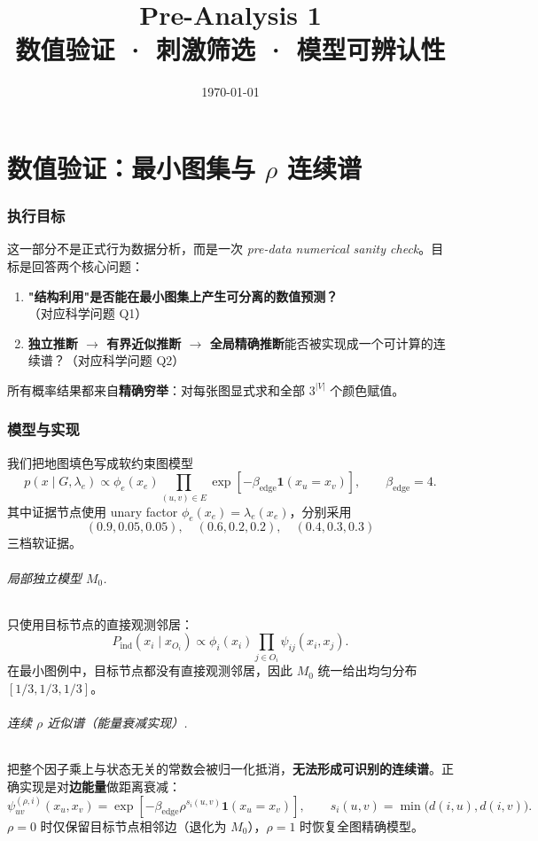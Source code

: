 \documentclass[11pt,a4paper]{ctexart}
\title{Pre-Analysis 1\\[4pt]
\large 数值验证 · 刺激筛选 · 模型可辨认性}
\author{}
\date{\today}
\begin{document}
\maketitle

\tableofcontents
\bigskip

\part{数值验证：最小图集与 $\rho$ 连续谱}

\section{执行目标}

这一部分不是正式行为数据分析，而是一次 \emph{pre-data numerical sanity check}。目标是回答两个核心问题：
\begin{enumerate}
    \item \textbf{"结构利用"是否能在最小图集上产生可分离的数值预测？}（对应科学问题 Q1）
    \item \textbf{独立推断 $\rightarrow$ 有界近似推断 $\rightarrow$ 全局精确推断}能否被实现成一个可计算的连续谱？（对应科学问题 Q2）
\end{enumerate}

所有概率结果都来自\textbf{精确穷举}：对每张图显式求和全部 $3^{|V|}$ 个颜色赋值。

\section{模型与实现}

我们把地图填色写成软约束图模型
\[
p(x\mid G,\lambda_e)\propto
\phi_e(x_e)\prod_{(u,v)\in E}\exp\!\left[-\beta_{\mathrm{edge}}\mathbf{1}(x_u=x_v)\right],
\qquad \beta_{\mathrm{edge}}=4.
\]
其中证据节点使用 unary factor $\phi_e(x_e)=\lambda_e(x_e)$，分别采用
\[
(0.9,0.05,0.05),\quad (0.6,0.2,0.2),\quad (0.4,0.3,0.3)
\]
三档软证据。

\paragraph{局部独立模型 $M_0$.}
只使用目标节点的直接观测邻居：
\[
P_{\mathrm{ind}}(x_i\mid x_{O_i})
\propto
\phi_i(x_i)\prod_{j\in O_i}\psi_{ij}(x_i,x_j).
\]
在最小图例中，目标节点都没有直接观测邻居，因此 $M_0$ 统一给出均匀分布 $[1/3,1/3,1/3]$。

\paragraph{连续 $\rho$ 近似谱（能量衰减实现）.}
把整个因子乘上与状态无关的常数会被归一化抵消，\textbf{无法形成可识别的连续谱}。正确实现是对\textbf{边能量}做距离衰减：
\[
\psi^{(\rho,i)}_{uv}(x_u,x_v)
=
\exp\!\left[
-\beta_{\mathrm{edge}}\rho^{s_i(u,v)}\mathbf{1}(x_u=x_v)
\right],
\qquad
s_i(u,v)=\min\!\bigl(d(i,u),d(i,v)\bigr).
\]
$\rho=0$ 时仅保留目标节点相邻边（退化为 $M_0$），$\rho=1$ 时恢复全图精确模型。
\end{document}
